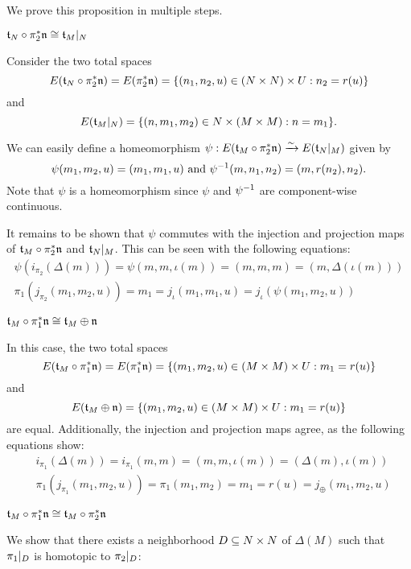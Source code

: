 \begin{myproof} We prove this proposition in multiple steps. \begin{steps} \item $\mathfrak{t}_N \circ \pi_2^*\mathfrak{n} \cong \mathfrak{t}_M\vert_{N}$

Consider the two total spaces \[ E(\mathfrak{t}_N \circ \pi_2^*\mathfrak{n}) = E(\pi_2^*\mathfrak{n}) = \{(n_1, n_2, u) \in (N \times N) \times U:n_2 = r(u)\} \] and \[ E(\mathfrak{t}_M\vert_{N}) = \{(n, m_1, m_2) \in N \times (M \times M):n = m_1\}. \]

We can easily define a homeomorphism $\psi: E(\mathfrak{t}_M \circ \pi_2^*\mathfrak{n}) \xrightarrow{\sim} E(\mathfrak{t}_N\vert_{M})$ given by \[ \psi(m_1, m_2, u) = (m_1, m_1, u) \text{ and } \psi^{-1}(m, n_1, n_2) = (m, r(n_2), n_2). \] Note that $\psi$ is a homeomorphism since $\psi$ and $\psi^{-1}$ are component-wise continuous.

It remains to be shown that $\psi$ commutes with the injection and projection maps of $\mathfrak{t}_M \circ \pi_2^*\mathfrak{n}$ and $\mathfrak{t}_N\vert_{M}$. This can be seen with the following equations: \begin{align} \psi(i_{\pi_2}(\Delta(m))) = \psi(m, m, \iota(m)) = (m, m, m) = (m, \Delta(\iota(m))) \\ \pi_1(j_{\pi_2}(m_1, m_2, u)) = m_1 = j_\iota(m_1, m_1, u) = j_\iota(\psi(m_1, m_2, u)) \end{align}

\item $\mathfrak{t}_M \circ \pi_1^*\mathfrak{n} \cong \mathfrak{t}_M \oplus{} \mathfrak{n}$

In this case, the two total spaces \[ E(\mathfrak{t}_M \circ \pi_1^*\mathfrak{n}) = E(\pi_1^*\mathfrak{n}) = \{(m_1, m_2, u) \in (M \times M) \times U:m_1 = r(u)\} \] and \[ E(\mathfrak{t}_M \oplus{} \mathfrak{n}) = \{(m_1, m_2, u) \in (M \times M) \times U:m_1 = r(u)\} \] are equal. Additionally, the injection and projection maps agree, as the following equations show: \begin{align} & i_{\pi_1}(\Delta(m)) = i_{\pi_1}(m, m) = (m, m, \iota(m)) = (\Delta(m), \iota(m)) \\ & \pi_1(j_{\pi_1}(m_1, m_2, u)) = \pi_1(m_1, m_2) = m_1 = r(u) = j_{\oplus}(m_1, m_2, u) \end{align}

\item $\mathfrak{t}_M \circ \pi_1^*\mathfrak{n} \cong \mathfrak{t}_M \circ \pi_2^*\mathfrak{n}$

We show that there exists a neighborhood $D \subseteq{} N \times N$ of $\Delta(M)$ such that $\pi_1\vert_{D}$ is homotopic to $\pi_2\vert_{D}$:


\end{steps}
\end{myproof}
